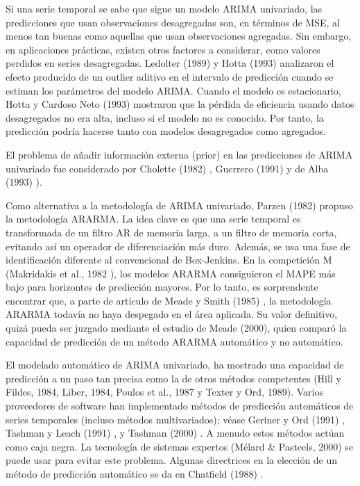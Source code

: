 \documentclass{llncs}
\begin{document}
Si una serie temporal se sabe que sigue un modelo ARIMA univariado, las predicciones que usan observaciones desagregadas son, en términos de MSE, al menos tan buenas como aquellas que usan observaciones agregadas. Sin embargo, en aplicaciones prácticas, existen otros factores a considerar, como valores perdidos en series desagregadas. Ledolter (1989) \cite{-} y Hotta (1993) analizaron el efecto producido de un outlier aditivo en el intervalo de predicción cuando se estiman los parámetros del modelo ARIMA. Cuando el modelo es estacionario, Hotta y Cardoso Neto (1993) mostraron que la pérdida de eficiencia usando datos desagregados no era alta, incluso si el modelo no es conocido. Por tanto, la predicción podría hacerse tanto con modelos desagregados como agregados.

El problema de añadir información externa (prior) en las predicciones de ARIMA univariado fue considerado por Cholette (1982) \cite{Cholette1982375}, Guerrero (1991) \cite{Guerrero1991339} y de Alba (1993) \cite{deAlba199395}).

Como alternativa a la metodología de ARIMA univariado, Parzen (1982) \cite{-} propuso la metodología ARARMA. La idea clave es que una serie temporal es transformada de un filtro AR de memoria larga, a un filtro de memoria corta, evitando así un operador de diferenciación más duro. Además, se usa una fase de identificación diferente al convencional de Box-Jenkins. En la competición M (Makridakis et al., 1982 \cite{-}), los modelos ARARMA consiguieron el MAPE más bajo para horizontes de predicción mayores. Por lo tanto, es sorprendente encontrar que, a parte de artículo de Meade y Smith (1985) \cite{-}, la metodología ARARMA todavía no haya despegado en el área aplicada. Su valor definitivo, quizá pueda ser juzgado mediante el estudio  de Meade (2000), quien comparó la capacidad de predicción de un método ARARMA automático y no automático.

El modelado automático de ARIMA univariado, ha mostrado una capacidad de predicción a un paso tan precisa como la de otros métodos competentes (Hill y Fildes, 1984, Liber, 1984, Poulos et al., 1987 y Texter y Ord, 1989). Varios proveedores de software han implementado métodos de predicción automáticos de series temporales (incluso métodos multivariados); véase Geriner y Ord (1991) \cite{Geriner1991127}, Tashman y Leach (1991) \cite{-}, y Tashman (2000) \cite{-}. A menudo estos métodos actúan como caja negra. La tecnología de sistemas expertos (Mélard \& Pasteels, 2000) se puede usar para evitar este problema. Algunas directrices en la elección de un método de predicción automático se da en Chatfield (1988) \cite{Chatfield198819}.
\end{document}

